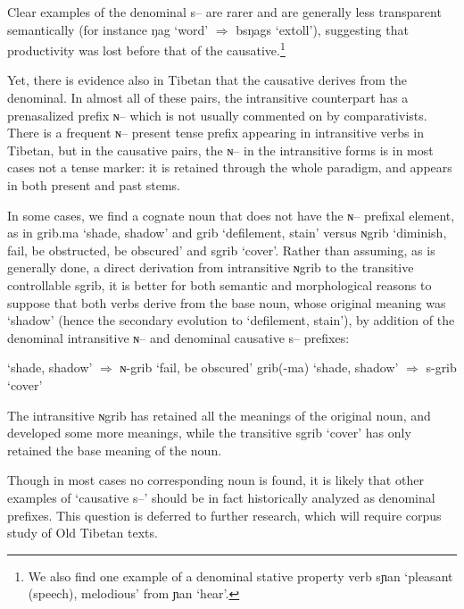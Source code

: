 \documentclass[oldfontcommands,oneside,a4paper,11pt]{article}
\newcommand{\ipa}[1]{{\phon \mbox{#1}}} %
\begin{document}
Clear examples of the denominal \ipa{s--} are rarer and are generally less transparent semantically (for instance \ipa{ŋag} `word' $\Rightarrow$ \ipa{bsŋags} `extoll'), suggesting that productivity was lost before that of the causative.\footnote{We also find one example of a denominal stative property verb \ipa{sɲan} `pleasant (speech), melodious' from \ipa{ɲan} `hear'. }

Yet, there is evidence also in Tibetan that the causative derives from the denominal.  In almost all of these pairs, the intransitive counterpart has a prenasalized prefix \ipa{ɴ--} which is not usually commented on by comparativists. There is a frequent \ipa{ɴ--} present tense prefix appearing in intransitive verbs in Tibetan, but in the causative pairs, the  \ipa{ɴ--} in the intransitive forms is in most cases not a tense marker: it is retained through the whole paradigm, and appears in both present and past stems.

 In some cases, we find a cognate noun that does not have the  \ipa{ɴ--} prefixal element, as in \ipa{grib.ma} `shade, shadow'  and \ipa{grib} `defilement, stain' versus \ipa{ɴgrib} `diminish, fail, be obstructed, be obscured' and  \ipa{sgrib} `cover'. Rather than assuming, as is generally done, a direct derivation from intransitive  \ipa{ɴgrib}  to the transitive controllable \ipa{sgrib}, it is better for both semantic and morphological reasons to suppose that both verbs derive from the base noun, whose original meaning was `shadow' (hence the secondary evolution to `defilement, stain'), by addition of the denominal intransitive \ipa{ɴ--} and denominal causative \ipa{s--} prefixes:
 
\begin{exe}
\ex \label{exgrib}
\glt  \ipa{grib(-ma)} `shade, shadow'  $\Rightarrow$   \ipa{ɴ-grib} `fail, be obscured'
\glt 
 \ipa{grib(-ma)} `shade, shadow'  $\Rightarrow$   \ipa{s-grib} `cover'
\end{exe}

The intransitive \ipa{ɴgrib} has retained all the meanings of the original noun, and developed some more meanings, while the transitive \ipa{sgrib} `cover' has only retained the base meaning of the noun.  

Though in most cases no corresponding noun is found, it is likely that other examples of  `causative \ipa{s--}' should be in fact historically analyzed as denominal prefixes. This question is deferred to further research, which will require corpus study of Old Tibetan texts.
\end{document}
